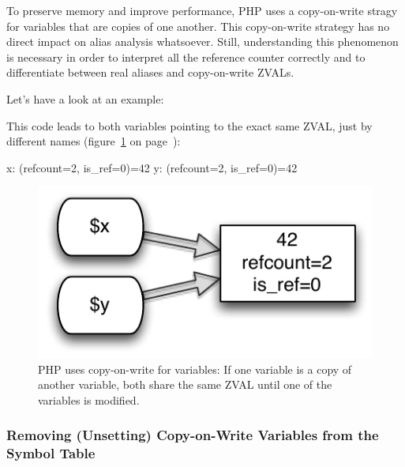 To preserve memory and improve performance, PHP uses a copy-on-write stragy for variables that are copies of one another. This copy-on-write strategy has no direct im\-pact on alias analysis whatsoever. Still, understanding this phenomenon is necessary in order to interpret all the reference counter correctly and to differentiate between real aliases and copy-on-write ZVALs.

Let's have a look at an example:


This code leads to both variables pointing to the exact same ZVAL, just by different names (figure~\ref{fig:copy-on-write-variable} on page~\pageref{fig:copy-on-write-variable}):

\begin{textcode}
x: (refcount=2, is_ref=0)=42
y: (refcount=2, is_ref=0)=42
\end{textcode}

\begin{figure}[htb]
  \begin{center}
    \includegraphics[scale=0.8]{images/x_y_42}
    \caption{PHP uses copy-on-write for variables: If one variable is a copy of another variable, both share the same ZVAL until one of the variables is modified.}
    \label{fig:copy-on-write-variable}
  \end{center}
\end{figure}


\subsubsection{Removing (Unsetting) Copy-on-Write Variables from the Symbol Table}
\label{sec:unsetting}


